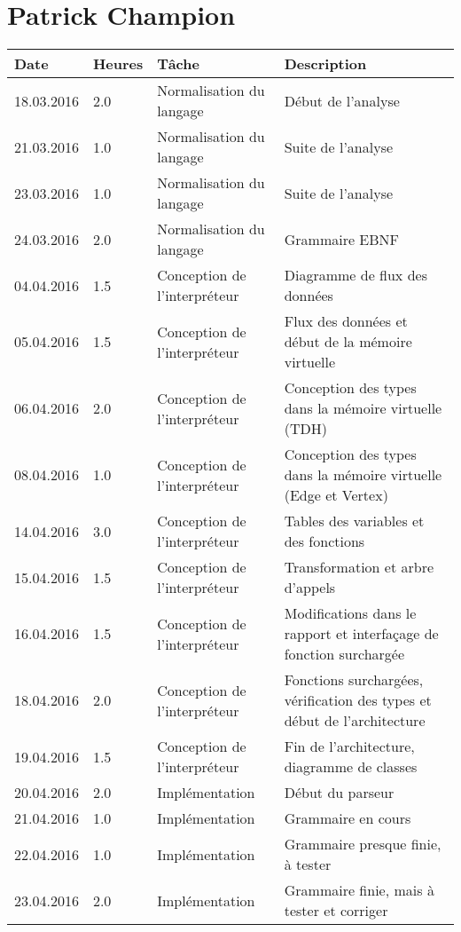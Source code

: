 \documentclass[french]{article}
\begin{document}
	\section*{Patrick Champion}
	\begin{longtable}{p{}|p{}|p{}|p{}}
		Date & Heures & Tâche & Description\\ 
		\hline \hline
		18.03.2016 & 2.0 & Normalisation du langage & Début de l'analyse\\ 
		\hline
		21.03.2016 & 1.0 & Normalisation du langage & Suite de l'analyse\\
		23.03.2016 & 1.0 & Normalisation du langage & Suite de l'analyse\\
		24.03.2016 & 2.0 & Normalisation du langage & Grammaire EBNF\\  
		\hline
		04.04.2016 & 1.5 & Conception de l'interpréteur & Diagramme de flux des données\\
		05.04.2016 & 1.5 & Conception de l'interpréteur & Flux des données et début de la mémoire virtuelle\\
		06.04.2016 & 2.0 & Conception de l'interpréteur & Conception des types dans la mémoire virtuelle (TDH)\\
		08.04.2016 & 1.0 & Conception de l'interpréteur & Conception des types dans la mémoire virtuelle (Edge et Vertex)\\ 
		\hline
		14.04.2016 & 3.0 & Conception de l'interpréteur & Tables des variables et des fonctions\\
		15.04.2016 & 1.5 & Conception de l'interpréteur & Transformation et arbre d'appels\\
		16.04.2016 & 1.5 & Conception de l'interpréteur & Modifications dans le rapport et interfaçage de fonction surchargée\\ 
		\hline
		18.04.2016 & 2.0 & Conception de l'interpréteur & Fonctions surchargées, vérification des types et début de l'architecture\\
		19.04.2016 & 1.5 & Conception de l'interpréteur & Fin de l'architecture, diagramme de classes\\ 
		20.04.2016 & 2.0 & Implémentation & Début du parseur\\
		21.04.2016 & 1.0 & Implémentation & Grammaire en cours\\
		22.04.2016 & 1.0 & Implémentation & Grammaire presque finie, à tester\\
		23.04.2016 & 2.0 & Implémentation & Grammaire finie, mais à tester et corriger\\

\end{longtable}
\end{document}

